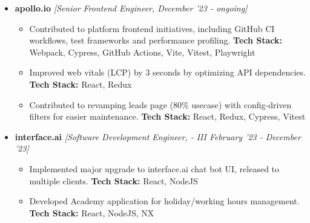 \documentclass[a4paper,11pt]{article}
\begin{document}
\vspace{0.05cm}
\begin{itemize}
\item \textbf{apollo.io} \emph{[Senior Frontend Engineer, December '23 - ongoing]}\\[-0.6cm]
\begin{itemize}
\item Contributed to platform frontend initiatives, including GitHub CI workflows, test frameworks and performance profiling.
\textbf{Tech Stack:} Webpack, Cypress, GitHub Actions, Vite, Vitest, Playwright
\item Improved web vitals (LCP) by 3 seconds by optimizing API dependencies.
\textbf{Tech Stack:} React, Redux
\item Contributed to revamping leads page (80\% usecase) with config-driven filters for easier maintenance.
\textbf{Tech Stack:} React, Redux, Cypress, Vitest
\end{itemize}

\item \textbf{interface.ai} \emph{[Software Development Engineer, - III February '23 - December '23]}\\[-0.6cm]
\begin{itemize}
\item Implemented major upgrade to interface.ai chat bot UI, released to multiple clients.
\textbf{Tech Stack:} React, NodeJS
\item Developed Academy application for holiday/working hours management.
\textbf{Tech Stack:} React, NodeJS, NX
\end{itemize}


\end{itemize}
\end{document}
